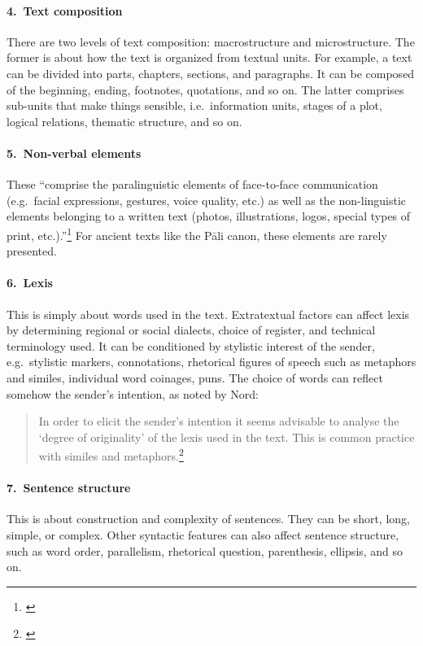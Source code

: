 \paragraph*{4.\ Text composition} There are two levels of text composition: macrostructure and microstructure. The former is about how the text is organized from textual units. For example, a text can be divided into parts, chapters, sections, and paragraphs. It can be composed of the beginning, ending, footnotes, quotations, and so on. The latter comprises sub-units that make things sensible, i.e.\ information units, stages of a plot, logical relations, thematic structure, and so on.

\paragraph*{5.\ Non-verbal elements} These ``comprise the paralinguistic elements of face-to-face communication (e.g.\ facial expressions, gestures, voice quality, etc.) as well as the non-linguistic elements belonging to a written text (photos, illustrations, logos, special types of print, etc.).''\footnote{\citealp[p.~118]{nord:analysis}} For ancient texts like the P\=ali canon, these elements are rarely presented.

\paragraph*{6.\ Lexis} This is simply about words used in the text. Extratextual factors can affect lexis by determining regional or social dialects, choice of register, and technical terminology used. It can be conditioned by stylistic interest of the sender, e.g.\ stylistic markers, connotations, rhetorical figures of speech such as metaphors and similes, individual word coinages, puns. The choice of words can reflect somehow the sender's intention, as noted by Nord:

\begin{quote}
In order to elicit the sender's intention it seems advisable to analyse the `degree of originality' of the lexis used in the text. This is common practice with similes and metaphors.\footnote{\citealp[p.~125]{nord:analysis}}
\end{quote}

\paragraph*{7.\ Sentence structure} This is about construction and complexity of sentences. They can be short, long, simple, or complex. Other syntactic features can also affect sentence structure, such as word order, parallelism, rhetorical question, parenthesis, ellipsis, and so on.

